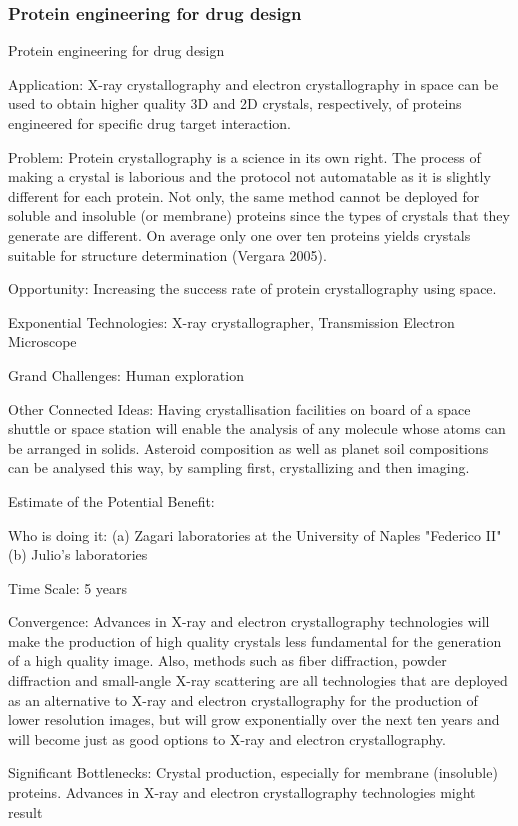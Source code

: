 \documentclass[letter,11pt]{article}
\begin{document}
\subsubsection{Protein engineering for drug design}

Protein engineering for drug design

Application: X-ray crystallography and electron crystallography in space can be used to obtain higher quality 3D and 2D crystals, respectively, of proteins engineered for specific drug target interaction.

Problem: Protein crystallography is a science in its own right. The process of making a crystal is laborious and the protocol not automatable as it is slightly different for each protein. Not only, the same method cannot be deployed for soluble and insoluble (or membrane) proteins since the types of crystals that they generate are different. On average only one over ten proteins yields crystals suitable for structure determination (Vergara 2005).

Opportunity: Increasing the success rate of protein crystallography using space.

Exponential Technologies: X-ray crystallographer, Transmission Electron Microscope

Grand Challenges: Human exploration

Other Connected Ideas: Having crystallisation facilities on board of a space shuttle or space station will enable the analysis of any molecule whose atoms can be arranged in solids. Asteroid composition as well as planet soil compositions can be analysed this way, by sampling first, crystallizing and then imaging.
 
Estimate of the Potential Benefit:

Who is doing it:
(a) Zagari laboratories at the University of Naples "Federico II"
(b) Julio's laboratories

Time Scale: 5 years

Convergence: Advances in X-ray and electron crystallography technologies will make the production of high quality crystals less fundamental for the generation of a high quality image. Also, methods such as fiber diffraction, powder diffraction and small-angle X-ray scattering are all technologies that are deployed as an alternative to X-ray and electron crystallography for the production of lower resolution images, but will grow exponentially over the next ten years and will become just as good options to X-ray and electron crystallography.

Significant Bottlenecks: Crystal production, especially for membrane (insoluble) proteins. Advances in X-ray and electron crystallography technologies might result



\clearpage
{}
{}
\nocite{*}



\clearpage
{}
{}
\printglossaries

\newpage
{}
{}
\printindex
\end{document}
